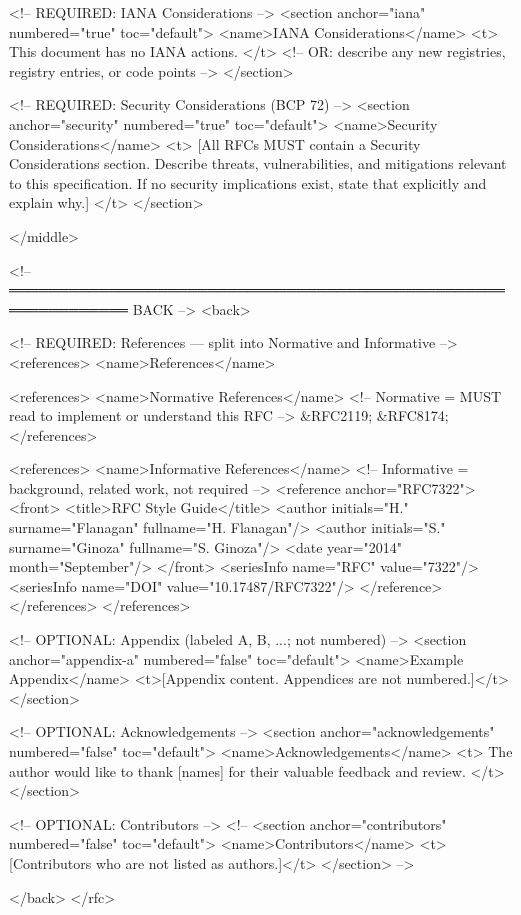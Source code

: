 \documentclass[11pt,letterpaper]{article}
\begin{document}
\begin{codebox}
  <!-- REQUIRED: IANA Considerations -->
  <section anchor="iana" numbered="true" toc="default">
    <name>IANA Considerations</name>
    <t>
      This document has no IANA actions.
    </t>
    <!-- OR: describe any new registries, registry entries, or code points -->
  </section>

  <!-- REQUIRED: Security Considerations (BCP 72) -->
  <section anchor="security" numbered="true" toc="default">
    <name>Security Considerations</name>
    <t>
      [All RFCs MUST contain a Security Considerations section.
       Describe threats, vulnerabilities, and mitigations relevant
       to this specification. If no security implications exist,
       state that explicitly and explain why.]
    </t>
  </section>

</middle>

<!-- ══════════════════════════════════════════════════════════════ BACK -->
<back>

  <!-- REQUIRED: References — split into Normative and Informative -->
  <references>
    <name>References</name>

    <references>
      <name>Normative References</name>
      <!-- Normative = MUST read to implement or understand this RFC -->
      &RFC2119;
      &RFC8174;
    </references>

    <references>
      <name>Informative References</name>
      <!-- Informative = background, related work, not required -->
      <reference anchor="RFC7322">
        <front>
          <title>RFC Style Guide</title>
          <author initials="H." surname="Flanagan" fullname="H. Flanagan"/>
          <author initials="S." surname="Ginoza" fullname="S. Ginoza"/>
          <date year="2014" month="September"/>
        </front>
        <seriesInfo name="RFC" value="7322"/>
        <seriesInfo name="DOI" value="10.17487/RFC7322"/>
      </reference>
    </references>
  </references>

  <!-- OPTIONAL: Appendix (labeled A, B, ...; not numbered) -->
  <section anchor="appendix-a" numbered="false" toc="default">
    <name>Example Appendix</name>
    <t>[Appendix content. Appendices are not numbered.]</t>
  </section>

  <!-- OPTIONAL: Acknowledgements -->
  <section anchor="acknowledgements" numbered="false" toc="default">
    <name>Acknowledgements</name>
    <t>
      The author would like to thank [names] for their valuable
      feedback and review.
    </t>
  </section>

  <!-- OPTIONAL: Contributors -->
  <!--
  <section anchor="contributors" numbered="false" toc="default">
    <name>Contributors</name>
    <t>[Contributors who are not listed as authors.]</t>
  </section>
  -->

</back>
</rfc>
\end{codebox}
\end{document}
